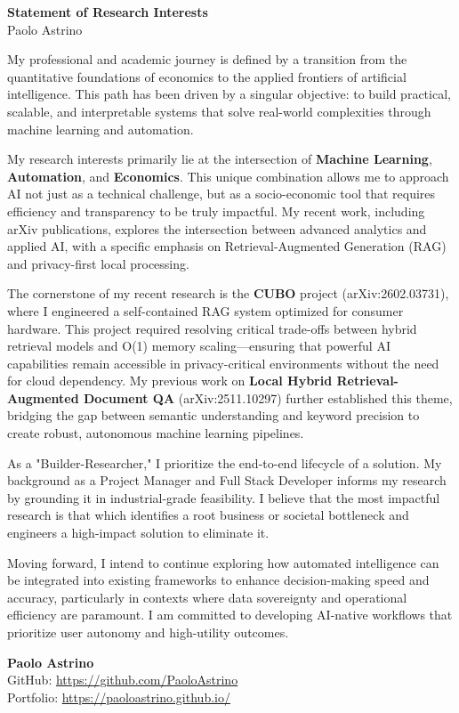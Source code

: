 \documentclass[a4paper,11pt]{article}
\begin{document}
\begin{center}
    {\Huge \textbf{Statement of Research Interests}} \\
    \vspace{2mm}
    {\Large Paolo Astrino}
\end{center}

\vspace{1cm}

My professional and academic journey is defined by a transition from the quantitative foundations of economics to the applied frontiers of artificial intelligence. This path has been driven by a singular objective: to build practical, scalable, and interpretable systems that solve real-world complexities through machine learning and automation.

My research interests primarily lie at the intersection of \textbf{Machine Learning}, \textbf{Automation}, and \textbf{Economics}. This unique combination allows me to approach AI not just as a technical challenge, but as a socio-economic tool that requires efficiency and transparency to be truly impactful. My recent work, including arXiv publications, explores the intersection between advanced analytics and applied AI, with a specific emphasis on Retrieval-Augmented Generation (RAG) and privacy-first local processing.

The cornerstone of my recent research is the \textbf{CUBO} project (arXiv:2602.03731), where I engineered a self-contained RAG system optimized for consumer hardware. This project required resolving critical trade-offs between hybrid retrieval models and O(1) memory scaling—ensuring that powerful AI capabilities remain accessible in privacy-critical environments without the need for cloud dependency. My previous work on \textbf{Local Hybrid Retrieval-Augmented Document QA} (arXiv:2511.10297) further established this theme, bridging the gap between semantic understanding and keyword precision to create robust, autonomous machine learning pipelines.

As a "Builder-Researcher," I prioritize the end-to-end lifecycle of a solution. My background as a Project Manager and Full Stack Developer informs my research by grounding it in industrial-grade feasibility. I believe that the most impactful research is that which identifies a root business or societal bottleneck and engineers a high-impact solution to eliminate it.

Moving forward, I intend to continue exploring how automated intelligence can be integrated into existing frameworks to enhance decision-making speed and accuracy, particularly in contexts where data sovereignty and operational efficiency are paramount. I am committed to developing AI-native workflows that prioritize user autonomy and high-utility outcomes.

\vspace{1cm}

\begin{flushleft}
    \textbf{Paolo Astrino} \\{}
    GitHub: \href{https://github.com/PaoloAstrino}{https://github.com/PaoloAstrino} \\{}
    Portfolio: \href{https://paoloastrino.github.io/}{https://paoloastrino.github.io/}
\end{flushleft}
\end{document}
